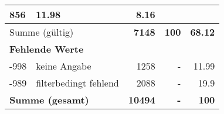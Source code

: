 \begin{longtable}{lXrrr}
       \num{856} &
       \num[round-mode=places,round-precision=2]{11.98} &
         \num[round-mode=places,round-precision=2]{8.16} \\
     \midrule
     \multicolumn{2}{l}{Summe (gültig)} &
       \textbf{\num{7148}} &
     \textbf{\num{100}} &
       \textbf{\num[round-mode=places,round-precision=2]{68.12}} \\
     \multicolumn{5}{l}{\textbf{Fehlende Werte}}\\
       -998 &
       keine Angabe &
         \num{1258} &
        - &
         \num[round-mode=places,round-precision=2]{11.99} \\
       -989 &
       filterbedingt fehlend &
         \num{2088} &
        - &
         \num[round-mode=places,round-precision=2]{19.9} \\
     \midrule
     \multicolumn{2}{l}{\textbf{Summe (gesamt)}} &
          \textbf{\num{10494}} &
        \textbf{-} &
        \textbf{\num{100}} \\
     \bottomrule
     \end{longtable}
     

